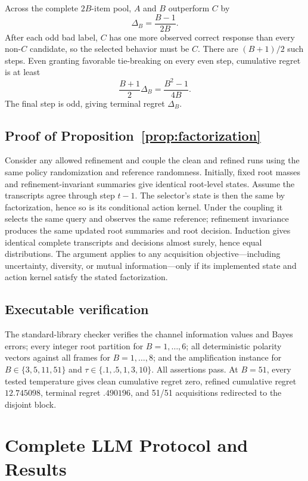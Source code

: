 Across the complete $2B$-item pool, $A$ and $B$ outperform $C$ by
\[
\Delta_B=\frac{B-1}{2B}.
\]
After each odd bad label, $C$ has one more observed correct response than every non-$C$ candidate, so the selected behavior must be $C$. There are $(B+1)/2$ such steps. Even granting favorable tie-breaking on every even step, cumulative regret is at least
\[
\frac{B+1}{2}\Delta_B=\frac{B^2-1}{4B}.
\]
The final step is odd, giving terminal regret $\Delta_B$.

\subsection{Proof of Proposition~\ref{prop:factorization}}

Consider any allowed refinement and couple the clean and refined runs using the same policy randomization and reference randomness. Initially, fixed root masses and refinement-invariant summaries give identical root-level states. Assume the transcripts agree through step $t-1$. The selector's state is then the same by factorization, hence so is its conditional action kernel. Under the coupling it selects the same query and observes the same reference; refinement invariance produces the same updated root summaries and root decision. Induction gives identical complete transcripts and decisions almost surely, hence equal distributions. The argument applies to any acquisition objective---including uncertainty, diversity, or mutual information---only if its implemented state and action kernel satisfy the stated factorization.

\subsection{Executable verification}

The standard-library checker verifies the channel information values and Bayes errors; every integer root partition for $B=1,\ldots,6$; all deterministic polarity vectors against all frames for $B=1,\ldots,8$; and the amplification instance for $B\in\{3,5,11,51\}$ and $\tau\in\{.1,.5,1,3,10\}$. All assertions pass. At $B=51$, every tested temperature gives clean cumulative regret zero, refined cumulative regret $12.745098$, terminal regret $.490196$, and 51/51 acquisitions redirected to the disjoint block.

\section{Complete LLM Protocol and Results}
\label{app:llmprotocol}

